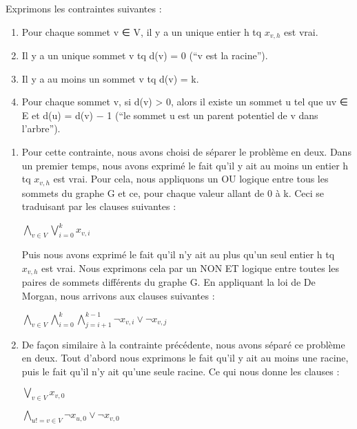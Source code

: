 \documentclass[a4paper]{article}
\begin{document}
Exprimons les contraintes suivantes : \\
\begin{enumerate}

\item Pour chaque sommet v ∈ V, il y a un unique entier h tq $x_{v,h}$ est vrai.
\item Il y a un unique sommet v tq d(v) = 0 (“v est la racine”).
\item Il y a au moins un sommet v tq d(v) = k.
\item Pour chaque sommet v, si d(v) > 0, alors il existe un sommet u tel que uv ∈ E et d(u) = d(v) − 1 (“le sommet u est un parent potentiel de v dans l’arbre”).
\end{enumerate}

\begin{enumerate}
\item
Pour cette contrainte, nous avons choisi de séparer le problème en deux.
Dans un premier temps, nous avons exprimé le fait qu'il y ait au moins un entier
h tq $x_{v, h}$ est vrai. Pour cela, nous appliquons un OU logique entre tous les
sommets du graphe G et ce, pour chaque valeur allant de 0 à k. Ceci se traduisant
par les clauses suivantes :
\begin{center}
$\bigwedge\limits_{v∈V}^{} \bigvee\limits_{i=0}^{k} x_{v,i}$
\end{center}

Puis nous avons exprimé le fait qu'il n'y ait au plus qu'un seul entier h tq
$x_{v, h}$ est vrai. Nous exprimons cela par un NON ET logique entre toutes les
paires de sommets différents du graphe G. En appliquant la loi de De Morgan, nous
arrivons aux clauses suivantes :
\begin{center}
$\bigwedge\limits_{v∈V}^{} \bigwedge\limits_{i=0}^{k} \bigwedge\limits_{j=i+1}^{k-1} \neg x_{v,i} \vee \neg x_{v,j} $
\end{center}

\item
De façon similaire à la contrainte précédente, nous avons séparé ce problème en
deux. Tout d'abord nous exprimons le fait qu'il y ait au moins une racine, puis
le fait qu'il n'y ait qu'une seule racine. Ce qui nous donne les clauses : \\
\begin{center}
$\bigvee\limits_{v∈V}^{} x_{v,0} $
\end{center}

\begin{center}
$\bigwedge\limits_{u!=v∈V}^{} \neg x_{u,0} \vee \neg x_{v,0}$
\end{center}


\end{enumerate}
\end{document}
